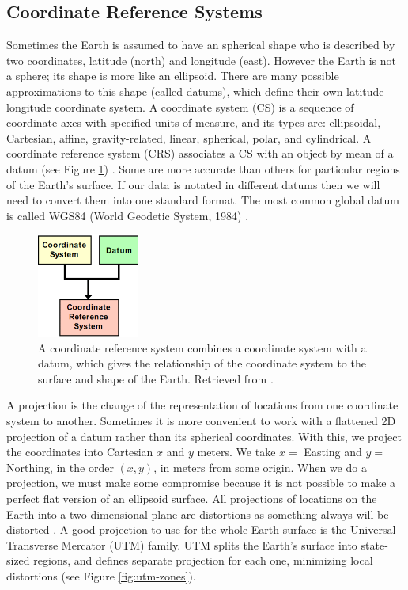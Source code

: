 {{\subsection{Coordinate Reference Systems}

Sometimes the Earth is assumed to have an spherical shape who is described by two coordinates, latitude (north) and longitude (east). However the Earth is not a sphere; its shape is more like an ellipsoid. There are many possible approximations to this shape (called datums), which define their own latitude-longitude coordinate system. A coordinate system (CS) is a sequence of coordinate axes with specified units of measure, and its types are: ellipsoidal, Cartesian, affine, gravity-related, linear, spherical, polar, and cylindrical. A coordinate reference system (CRS) associates a CS with an object by mean of a datum (see Figure \ref{fig:crs-datum}) \cite{nikolli_CRS_2011}. Some are more accurate than others for particular regions of the Earth's surface.  If our data is notated in different datums then we will need to convert them into one standard format. The most common global datum is called WGS84 (World Geodetic System, 1984) \cite{fox_spatial_2018}.

\begin{figure}[h!]
	\centering
	\includegraphics[width=0.3\textwidth]{Figures/coordinate system-datum_nikolli2011.png}
	\caption{A coordinate reference system combines a coordinate system with a datum, which gives the relationship of the coordinate system to the surface and shape of the Earth. Retrieved from \cite{nikolli_CRS_2011}.
		\label{fig:crs-datum}}
\end{figure}

A projection is the change of the representation of locations from one coordinate system to another. Sometimes it is more convenient to work with a flattened 2D projection of a datum rather than its spherical coordinates. With this, we project the coordinates into Cartesian $x$ and $y$ meters. We take $x=$ Easting and $y=$ Northing, in the order $(x, y)$, in meters from some origin. When we do a projection, we must make some compromise because it is not possible to make a perfect flat version of an ellipsoid surface. All projections of locations on the Earth into a two-dimensional plane are distortions as something always will be distorted \cite{lapaine_choosing_2017}. A good projection to use for the whole Earth surface is the Universal Transverse Mercator (UTM) family. UTM splits the Earth's surface into state-sized regions, and defines separate projection for each one, minimizing local distortions (see Figure \ref{fig:utm-zones}).

}}
